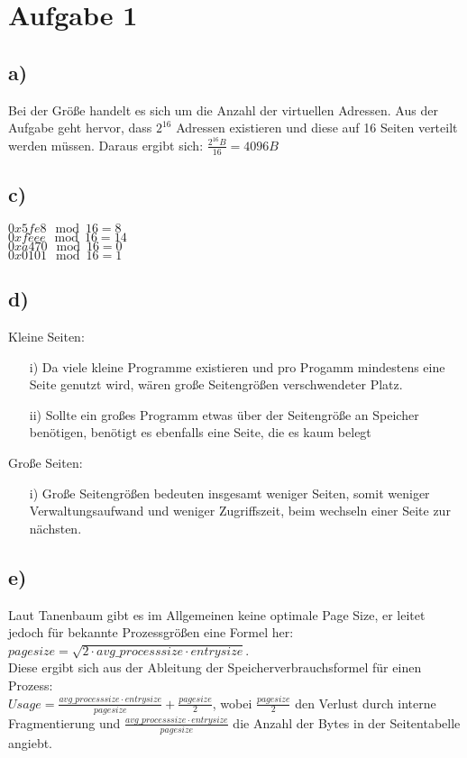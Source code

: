 \documentclass[a4paper,11pt,parskip=half]{scrartcl}
\title{\titleinfo}
\author{\authorinfo}
\date{\today}
\begin{document}
\maketitle

\section*{Aufgabe 1}
\subsection*{a)}
Bei der Größe handelt es sich um die Anzahl der virtuellen Adressen. Aus der Aufgabe geht hervor, dass \(2^{16}\) Adressen existieren und diese auf 16 Seiten verteilt werden müssen. Daraus ergibt sich: \(\frac{2^{16}B}{16} = 4096B\)

\subsection*{c)}
\(0x5fe8 \mod 16 = 8\) \\
\(0xfeee \mod 16 = 14\) \\
\(0xa470 \mod 16 = 0\) \\
\(0x0101 \mod 16 = 1\)

\subsection*{d)}
Kleine Seiten:
\begin{itemize}
	\item[i)] Da viele kleine Programme existieren und pro Progamm mindestens eine Seite genutzt wird, wären große Seitengrößen verschwendeter Platz. 
    \item[ii)] Sollte ein großes Programm etwas über der Seitengröße an Speicher benötigen, benötigt es ebenfalls eine Seite, die es kaum belegt
\end{itemize}
Große Seiten: 
\begin{itemize}
	\item[i)] Große Seitengrößen bedeuten insgesamt weniger Seiten, somit weniger Verwaltungsaufwand und weniger Zugriffszeit, beim wechseln einer Seite zur nächsten.
\end{itemize}


\subsection*{e)}
Laut Tanenbaum gibt es im Allgemeinen keine optimale Page Size,
er leitet jedoch für bekannte Prozessgrößen eine Formel her:
\(pagesize = \sqrt{2 \cdot avg\_processsize \cdot entrysize}\).\\
Diese ergibt sich aus der Ableitung der Speicherverbrauchsformel für einen Prozess: \\
\(Usage = \frac{avg\_processsize \cdot entrysize}{pagesize} + \frac{pagesize}{2}\), wobei \(\frac{pagesize}{2}\) den Verlust durch interne Fragmentierung und \(\frac{avg\_processsize \cdot entrysize}{pagesize}\) die Anzahl der Bytes in der Seitentabelle angiebt.
\end{document}

